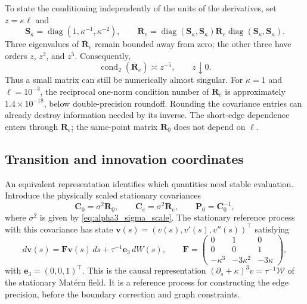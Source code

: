 \documentclass[11pt,a4paper]{article}
\theoremstyle{plain}
\theoremstyle{definition}
\begin{document}
To state the conditioning independently of the units of the
derivatives, set $z=\kappa\ell$ and
\begin{equation}
\mathbf S_\kappa=\operatorname{diag}(1,\kappa^{-1},\kappa^{-2}),
\qquad
\overline{\mathbf R}_e=
\operatorname{diag}(\mathbf S_\kappa,\mathbf S_\kappa)
\mathbf R_e
\operatorname{diag}(\mathbf S_\kappa,\mathbf S_\kappa).
\end{equation}
Three eigenvalues of $\overline{\mathbf R}_e$ remain bounded away from
zero; the other three have orders $z$, $z^3$, and $z^5$. Consequently,
\begin{equation}
\operatorname{cond}_2(\overline{\mathbf R}_e)\asymp z^{-5},
\qquad z\downarrow0.
\label{eq:short_edge_covariance_condition}
\end{equation}
Thus a small matrix can still be numerically almost singular. For
$\kappa=1$ and $\ell=10^{-3}$, the reciprocal one-norm condition
number of $\mathbf R_e$ is approximately $1.4\times10^{-18}$, below
double-precision roundoff. Rounding the covariance entries can already
destroy information needed by its inverse. The short-edge dependence
enters through $\mathbf R_e$; the same-point matrix $\mathbf R_0$
does not depend on $\ell$.

\subsection{Transition and innovation coordinates}

An equivalent representation identifies which quantities need stable
evaluation. Introduce the physically scaled stationary covariances
\begin{equation}
\mathbf C_0=\sigma^2\mathbf R_0,\qquad
\mathbf C_e=\sigma^2\mathbf R_e,\qquad
\mathbf P_0=\mathbf C_0^{-1},
\end{equation}
where $\sigma^2$ is given by \eqref{eq:alpha3_sigma_scale}.
The stationary reference process with this covariance has state
$\boldsymbol v(s)=(v(s),v'(s),v''(s))^\top$ satisfying
\begin{equation}
d\boldsymbol v(s)=\mathbf F\boldsymbol v(s)\,ds
                  +\tau^{-1}\mathbf e_3\,dW(s),
\qquad
\mathbf F=
\begin{pmatrix}
0&1&0\\0&0&1\\-\kappa^3&-3\kappa^2&-3\kappa
\end{pmatrix},
\label{eq:short_edge_state_equation}
\end{equation}
with $\mathbf e_3=(0,0,1)^\top$. This is the causal representation
$(\partial_s+\kappa)^3v=\tau^{-1}\mathcal W$ of the stationary
Mat\'ern field. It is a reference process for constructing the edge
precision, before the boundary correction and graph constraints.
\end{document}
